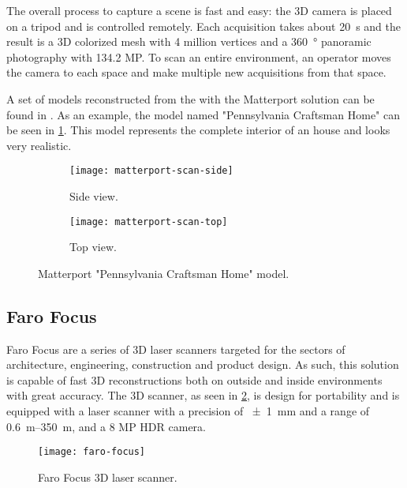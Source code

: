The overall process to capture a scene is fast and easy: the 3D camera is placed on a tripod and is controlled remotely. Each acquisition takes about \SI{20}{\second} and the result is a 3D colorized mesh with 4 million vertices and a \SI{360}{\degree} panoramic photography with 134.2 MP. To scan an entire environment, an operator moves the camera to each space and make multiple new acquisitions from that space.

A set of models reconstructed from the with the Matterport solution can be found in \cite{matterport-gallery}. As an example, the model named "Pennsylvania Craftsman Home" \cite{matterport-house} can be seen in \cref{fig:matterport-model}. This model represents the complete interior of an house and looks very realistic.

\begin{figure}[h]
    
    \centering
    \begin{subfigure}{\textwidth}
        \centering
        \texttt{[image: matterport-scan-side]}
        \caption{Side view.}
    \end{subfigure}

    \begin{subfigure}{\textwidth}
        \centering
        \texttt{[image: matterport-scan-top]}
        \caption{Top view.}
    \end{subfigure}

    \caption{Matterport "Pennsylvania Craftsman Home" model.}
    \label{fig:matterport-model}
\end{figure}

\subsection{Faro Focus}

Faro Focus \cite{faro-focus} are a series of 3D laser scanners targeted for the sectors of architecture, engineering, construction and product design. As such, this solution is capable of fast 3D reconstructions both on outside and inside environments with great accuracy. The 3D scanner, as seen in \cref{fig:faro-focus}, is design for portability and is equipped with a laser scanner with a precision of \SI{+-1}{\milli\meter} and a range of \SIrange{0.6}{350}{\meter}, and a 8 MP HDR camera.

\begin{figure}[h]
    \centering
    \texttt{[image: faro-focus]}
    \caption{Faro Focus 3D laser scanner.}
    \label{fig:faro-focus}
\end{figure}

